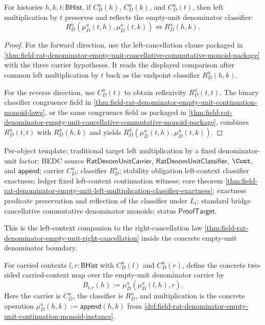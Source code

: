 \begin{theorem}
\label{thm:field-rat-denominator-empty-unit-left-multiplication-classifier-exactness}
For histories $h,k,t:\mathsf{BHist}$, if $C_D^u(h)$, $C_D^u(k)$, and
$C_D^u(t)$, then left multiplication by $t$ preserves and reflects the
empty-unit denominator classifier:
$$
R_D^u(\mu_D^u(t,h),\mu_D^u(t,k)) \Longleftrightarrow R_D^u(h,k).
$$
\end{theorem}
\begin{proof}
For the forward direction, use the left-cancellation clause packaged in
\autoref{thm:field-rat-denominator-empty-unit-cancellative-commutative-monoid-package}
with the three carrier hypotheses. It reads the displayed comparison after
common left multiplication by $t$ back as the endpoint classifier $R_D^u(h,k)$.

For the reverse direction, use $C_D^u(t)$ to obtain reflexivity
$R_D^u(t,t)$. The binary classifier congruence field in
\autoref{thm:field-rat-denominator-empty-unit-continuation-monoid-laws}, or the
same congruence field as packaged in
\autoref{thm:field-rat-denominator-empty-unit-cancellative-commutative-monoid-package},
combines $R_D^u(t,t)$ with $R_D^u(h,k)$ and yields
$R_D^u(\mu_D^u(t,h),\mu_D^u(t,k))$.
\end{proof}

Per-object template: traditional target left multiplication by a fixed
denominator-unit factor; BEDC source $\mathsf{RatDenomUnitCarrier}$,
$\mathsf{RatDenomUnitClassifier}$, $\Cont$, and $\mathsf{append}$; carrier
$C_D^u$; classifier $R_D^u$; stability obligation left-context classifier
exactness; ledger fixed left-context continuation witness; core theorem
\autoref{thm:field-rat-denominator-empty-unit-left-multiplication-classifier-exactness};
exactness predicate preservation and reflection of the classifier under $L_t$;
standard bridge cancellative commutative denominator monoids; status
$\mathsf{ProofTarget}$.

This is the left-context companion to the right-cancellation law
\autoref{thm:field-rat-denominator-empty-unit-right-cancellation} inside the
concrete empty-unit denominator boundary.

\begin{definition}
\label{def:field-rat-denominator-empty-unit-bilateral-multiplication-context}
For carried contexts $l,r:\mathsf{BHist}$ with $C_D^u(l)$ and $C_D^u(r)$, define
the concrete two-sided carried-context map over the empty-unit denominator
carrier by
$$
B_{l,r}(h):=\mu_D^u(\mu_D^u(l,h),r).
$$
Here the carrier is $C_D^u$, the classifier is $R_D^u$, and multiplication is the
concrete operation $\mu_D^u(h,k):=\mathsf{append}(h,k)$ from
\autoref{def:field-rat-denominator-empty-unit-continuation-monoid-instance}.
\end{definition}

